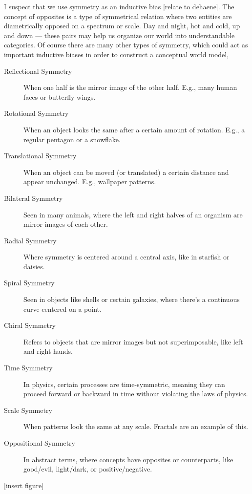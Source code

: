 I suspect that we use symmetry as an inductive bias [relate to dehaene]. The concept of opposites is a type of symmetrical relation where two entities are diametrically opposed on a spectrum or scale. Day and night, hot and cold, up and down — these pairs may help us organize our world into understandable categories. Of course there are many other types of symmetry, which could act as important inductive biases in order to construct a conceptual world model, 
\begin{description}
    \item[Reflectional Symmetry] When one half is the mirror image of the other half. E.g., many human faces or butterfly wings.
    \item[Rotational Symmetry] When an object looks the same after a certain amount of rotation. E.g., a regular pentagon or a snowflake.
    \item[Translational Symmetry] When an object can be moved (or translated) a certain distance and appear unchanged. E.g., wallpaper patterns.
    \item[Bilateral Symmetry] Seen in many animals, where the left and right halves of an organism are mirror images of each other.
    \item[Radial Symmetry] Where symmetry is centered around a central axis, like in starfish or daisies.
    \item[Spiral Symmetry] Seen in objects like shells or certain galaxies, where there's a continuous curve centered on a point.
    \item[Chiral Symmetry] Refers to objects that are mirror images but not superimposable, like left and right hands.
    \item[Time Symmetry] In physics, certain processes are time-symmetric, meaning they can proceed forward or backward in time without violating the laws of physics.
    \item[Scale Symmetry] When patterns look the same at any scale. Fractals are an example of this.
    \item[Oppositional Symmetry] In abstract terms, where concepts have opposites or counterparts, like good/evil, light/dark, or positive/negative.
\end{description} 

[insert figure]










